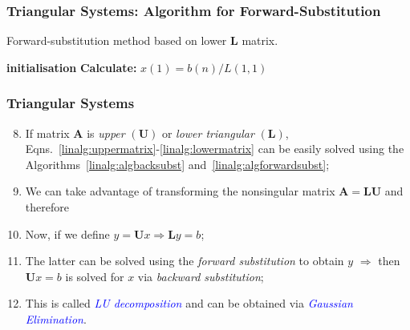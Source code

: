 \documentclass[10pt,compress]{beamer}
\begin{document}
\begin{frame}[fragile]
  \frametitle{Triangular Systems: Algorithm for Forward-Substitution} 
    \begin{algorithm}[H]\caption{Forward-substitution method based on lower $\bm{L}$ matrix.}
      {\bf initialisation}\;
      {\bf Calculate:} $x(1) = b(n) / L(1,1)$\;
        \label{linalg:algforwardsubst}
    \end{algorithm}
\end{frame}


\begin{frame}
  \frametitle{Triangular Systems} 
  \begin{enumerate}
  \setcounter{enumi}{7}
     \item <1-> If matrix $\bm{A}$ is {\it upper} $\left(\bm{U}\right)$ or {\it lower triangular} $\left(\bm{L}\right)$, Eqns.~\ref{linalg:uppermatrix}-\ref{linalg:lowermatrix} can be easily solved using the Algorithms~\ref{linalg:algbacksubst} and~\ref{linalg:algforwardsubst};
     \item <2-> We can take advantage of transforming the nonsingular matrix $\bm{A}=\bm{L}\bm{U}$ and therefore
     \item <3-> Now, if we define $y=\bm{U}x \Longrightarrow \bm{L}y=b$;
     \item <4-> The latter can be solved using the {\it forward substitution} to obtain $y$ $\Longrightarrow$ then $\bm{U}x=b$ is solved for $x$ via {\it backward substitution};
     \item <5-> This is called \textcolor{blue}{\it LU decomposition} and can be obtained via \textcolor{blue}{\it Gaussian Elimination}.
  \end{enumerate}
\end{frame}
\end{document}
